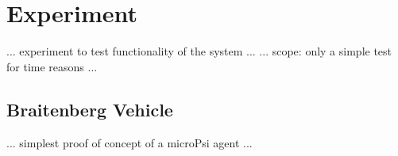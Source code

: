 \chapter{Experiment}
... experiment to test functionality of the system ...
... scope: only a simple test for time reasons ...

\section{Braitenberg Vehicle}
... simplest proof of concept of a microPsi agent ...